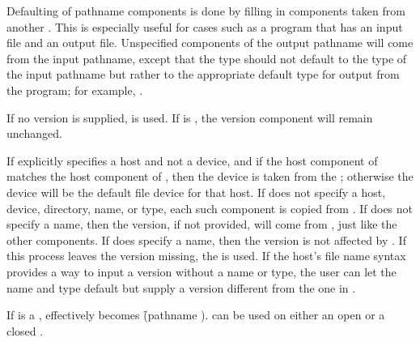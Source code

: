 Defaulting of pathname components 
is done by filling in components taken from another .
This is especially useful for cases such as 
a program that has an input file and an output file.
Unspecified components of the output pathname will come from the input pathname,
except that the type should not default
to the type of the input pathname
but rather to the appropriate default type for output from the program;
for example, .

If no version is supplied,  is used.
If  is \nil, the version component will remain unchanged.

If  explicitly specifies a host and not a device, and 
if the host component of  matches the host component
of , then the device is taken from the ;
otherwise the device will be the default file device for that host.  If
 does not specify a host, device, directory, name,
or type, each such component is copied from .
If  does not specify a name, then the version, if not provided, will
come from , just like the other components.  If
 does specify a name, then the version is not affected
by . If this process leaves the
version missing, the  is used.
If the host's file name syntax provides a way
to input a version without a name or type, the user can let the name
and type default but supply a version different from the one in .

If  is a ,  effectively
becomes \f{(pathname )}. 
can be used on either an open or a closed .

